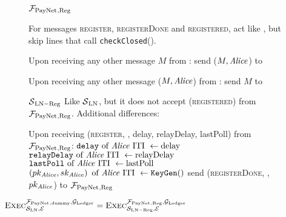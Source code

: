 \begin{figure}[H]
  \begin{systembox}{$\mathcal{F}_{\mathrm{PayNet}}{}_{\mathrm{, Reg}}$}
    \begin{algorithmic}[1]
      \State For messages \textsc{register}, \textsc{registerDone} and
      \textsc{registered}, act like \fpaynet{}, but skip lines that call
      \texttt{checkClosed}().
      \Statex

      \State Upon receiving any other message $M$ from \alice:
      \Indent
          \State send ($M, \mathit{Alice}$) to \simulator
        \EndIf
      \EndIndent
      \Statex

      \State Upon receiving any other message ($M, \mathit{Alice}$) from \simulator:
      \Indent
          \State send $M$ to \alice
        \EndIf
      \EndIndent
    \end{algorithmic}
  \end{systembox}
  \caption{}
  \label{alg:proof:fpaynet:reg}
\end{figure}

\begin{figure}[H]
  \begin{simulatorbox}{$\mathcal{S}{}_{\mathrm{LN - Reg}}$}
    Like $\mathcal{S}{}_{\mathrm{LN}}$, but it does not accept
    (\textsc{registered}) from $\mathcal{F}_{\mathrm{PayNet}}{}_{\mathrm{, Reg}}$.
    Additional differences:
    \begin{algorithmic}[1]
      \State Upon receiving (\textsc{register}, \alice, delay, relayDelay,
      lastPoll) from $\mathcal{F}_{\mathrm{PayNet}}{}_{\mathrm{, Reg}}$:
      \Indent
        \State $\mathtt{delay} \text{ of \ensuremath{\mathit{Alice}}{} ITI } \gets \mathrm{delay}$
        \label{alg:sim:reg:delay}
        \State $\mathtt{relayDelay} \text{ of \ensuremath{\mathit{Alice}}{} ITI } \gets
        \mathrm{relayDelay}$
        \State $\mathtt{lastPoll} \text{ of \ensuremath{\mathit{Alice}}{} ITI } \gets
        \mathrm{lastPoll}$
        \State $\left(pk_{\mathit{Alice}}, sk_{\mathit{Alice}}\right) \text{ of \ensuremath{\mathit{Alice}}{} ITI }
        \gets \mathtt{KeyGen}()$
        \label{alg:sim:reg:keygen}
        \State send (\textsc{registerDone}, \alice, $pk_{\mathit{Alice}}$) to
        $\mathcal{F}_{\mathrm{PayNet}}{}_{\mathrm{, Reg}}$
      \EndIndent
    \end{algorithmic}
  \end{simulatorbox}
  \caption{}
  \label{alg:sim:reg}
\end{figure}

\begin{lemma}
  \label{lemma:reg}
  $\textsc{Exec}^{\mathcal{F}_{\mathrm{PayNet}}{}_{\mathrm{, dummy}},
  \mathcal{G}_{\mathrm{Ledger}}}_{\mathcal{S}_{\mathrm{LN}}, \mathcal{E}} =
  \textsc{Exec}^{\mathcal{F}_{\mathrm{PayNet}}{}_{\mathrm{, Reg}},
  \mathcal{G}_{\mathrm{Ledger}}}_{\mathcal{S}_{\mathrm{LN - Reg}}, \mathcal{E}}$
\end{lemma}

